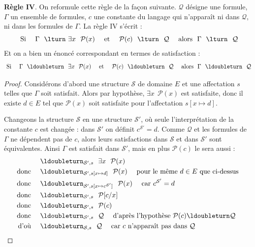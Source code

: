 \documentclass[11pt,class=report,crop=false]{standalone}
\begin{document}
\medskip

\textbf{Règle IV}. On reformule cette règle de la façon suivante. $\mathcal{Q}$ désigne une formule, $\Gamma$ un ensemble de formules, $c$ une constante du langage qui n'apparaît ni dans $\mathcal{Q}$, ni dans les formules de $\Gamma$. La règle IV s'écrit :
\[
\text{ Si } \quad \Gamma \ \ \lturn \ \exists x \ \ \mathcal{P}(x)
\quad \text{ et } \quad \mathcal{P}(c) \ \ \lturn \ \ \mathcal{Q}  \quad 
\text{ alors } \ \Gamma \ \ \lturn \ \ \mathcal{Q}
\]
Et on a bien un énoncé correspondant en termes de satisfaction :
\[
\text{ Si } \quad \Gamma \ \ \ldoubleturn \ \ \exists x \ \ \mathcal{P}(x)
\quad \text{ et } \quad \mathcal{P}(c) \ \ \ldoubleturn \ \ \mathcal{Q}  \quad 
\text{ alors } \ \Gamma \ \ \ldoubleturn \ \ \mathcal{Q}
\]

\begin{proof}
	Considérons d'abord une structure $\mathcal{S}$ de domaine $E$ et une affectation $s$ telles que $\Gamma$ soit satisfait.
	Alors par hypothèse, \og{}$\exists x \ \ \mathcal{P}(x)$\fg{} est satisfaite, donc il existe $d \in E$ tel que $\mathcal{P}(x)$ soit satisfaite pour l'affectation $s[x \mapsto d]$.
	
	Changeons la structure $\mathcal{S}$ en une structure $\mathcal{S}'$, où seule l'interprétation de la constante $c$ est changée : dans $\mathcal{S}'$ on définit $c^{\mathcal{S}'} = d$.	
	Comme $\mathcal{Q}$ et les formules de $\Gamma$ ne dépendent pas de $c$, alors leurs satisfactions dans $\mathcal{S}$ et dans $\mathcal{S}'$ sont équivalentes.	
	Ainsi $\Gamma$ est satisfait dans $\mathcal{S}'$, mais en plus $\mathcal{P}(c)$ le sera aussi :
	\begin{align*}
						& \ldoubleturn_{\mathcal{S}',s} \ \ \exists x \ \ \mathcal{P}(x) \\	
		\text{ donc } \quad & \ldoubleturn_{\mathcal{S}',s[x \mapsto d]} \ \ \mathcal{P}(x) \quad \text{ pour le même $d \in E$ que ci-dessus } \\ 
		\text{ donc } \quad 	& \ldoubleturn_{\mathcal{S}',s[x \mapsto c^{\mathcal{S}'}]} \ \ \mathcal{P}(x) \quad \text{ car $c^{\mathcal{S}'} = d$} \\ 		
		\text{ donc } 	\quad & \ldoubleturn_{\mathcal{S}',s} \ \ \mathcal{P}[c/x] \\	
		\text{ donc }  \quad  & \ldoubleturn_{\mathcal{S}',s} \ \ \mathcal{P}(c) \\
		\text{ donc }  \quad  & \ldoubleturn_{\mathcal{S}',s} \ \ \mathcal{Q} \quad \text{ d'après l'hypothèse } \mathcal{P}(c) \ldoubleturn \mathcal{Q}\\
		\text{ d'où }  \quad  & \ldoubleturn_{\mathcal{S},s} \ \ \mathcal{Q} \quad \text{ car $c$ n'apparaît pas dans $\mathcal{Q}$ }\\		
	\end{align*} 
	
\end{proof}
\end{document}
